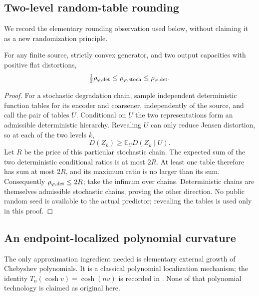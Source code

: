 \subsection{Two-level random-table rounding}
We record the elementary rounding observation used below, without claiming
it as a new randomization principle.
\begin{lemma}
\label{lem:ext-rounding}
For any finite source, strictly convex generator, and two output capacities
with positive flat distortions,
\[
 \tfrac12\rho_{\varphi,\mathrm{det}}\le\rho_{\varphi,\mathrm{stoch}}
 \le\rho_{\varphi,\mathrm{det}}.
\]
\end{lemma}
\begin{proof}
For a stochastic degradation chain, sample independent deterministic function
tables for its encoder and coarsener, independently of the source, and call
the pair of tables $U$. Conditional on $U$ the two representations form an
admissible deterministic hierarchy. Revealing $U$ can only reduce Jensen
distortion, so at each of the two levels $k$,
\[
 D(Z_k)\ge\mathbb E_U D(Z_k\mid U).
\]
Let $R$ be the price of this particular stochastic chain. The expected sum of
the two deterministic conditional ratios is at most $2R$. At least one table
therefore has sum at most $2R$, and its maximum ratio is no larger than its
sum. Consequently $\rho_{\varphi,\mathrm{det}}\le2R$; take the infimum over chains.
Deterministic chains are themselves admissible stochastic chains, proving the
other direction. No public random seed is available to the actual predictor;
revealing the tables is used only in this proof.
\end{proof}

\subsection{An endpoint-localized polynomial curvature}
The only approximation ingredient needed is elementary external growth of
Chebyshev polynomials. It is a classical polynomial localization mechanism;
the identity $T_n(\cosh v)=\cosh(nv)$ is recorded in
\cite[Eq.~18.5.1]{dlmf}. None of that polynomial technology is claimed as
original here.

